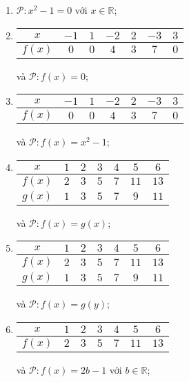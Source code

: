 \begin{enumerate}
   \item $\mathcal{P}: x^2 - 1 = 0$ với $x \in \mathbb{R}$;
   \item
   \begin{tabular}{|c|c|c|c|c|c|c|}
      \hline
      $x$ & $-1$ & $1$ & $-2$ & $2$ & $-3$ & $3$\\
      \hline
      $f(x)$ & $0$ & $0$ & $4$ & $3$ & $7$ & $0$\\
      \hline
   \end{tabular} và $\mathcal{P}: f(x) = 0$;

   \item
   \begin{tabular}{|c|c|c|c|c|c|c|}
      \hline
      $x$ & $-1$ & $1$ & $-2$ & $2$ & $-3$ & $3$\\
      \hline
      $f(x)$ & $0$ & $0$ & $4$ & $3$ & $7$ & $0$\\
      \hline
   \end{tabular} và $\mathcal{P}: f(x) = x^2 - 1$;

   \item
   \begin{tabular}{|c|c|c|c|c|c|c|}
      \hline
      $x$ & $1$ & $2$ & $3$ & $4$ & $5$ & $6$\\
      \hline
      $f(x)$ & $2$ & $3$ & $5$ & $7$ & $11$ & $13$\\
      \hline
      $g(x)$ & $1$ & $3$ & $5$ & $7$ & $9$ & $11$\\
      \hline
   \end{tabular} và $\mathcal{P}: f(x) = g(x)$;

   \item
   \begin{tabular}{|c|c|c|c|c|c|c|}
      \hline
      $x$ & $1$ & $2$ & $3$ & $4$ & $5$ & $6$\\
      \hline
      $f(x)$ & $2$ & $3$ & $5$ & $7$ & $11$ & $13$\\
      \hline
      $g(x)$ & $1$ & $3$ & $5$ & $7$ & $9$ & $11$\\
      \hline
   \end{tabular} và $\mathcal{P}: f(x) = g(y)$;

   \item
   \begin{tabular}{|c|c|c|c|c|c|c|}
      \hline
      $x$ & $1$ & $2$ & $3$ & $4$ & $5$ & $6$\\
      \hline
      $f(x)$ & $2$ & $3$ & $5$ & $7$ & $11$ & $13$\\
      \hline
   \end{tabular} và $\mathcal{P}: f(x) = 2b-1$ với $b \in \mathbb{R}$;


\end{enumerate}
